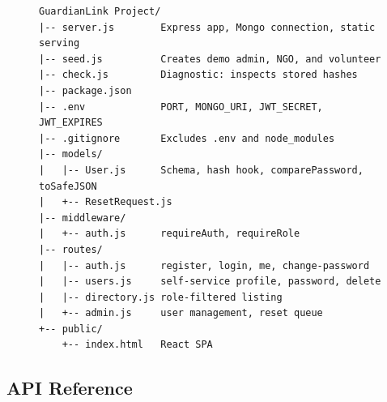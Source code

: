 \documentclass[11pt,letterpaper]{article}
\begin{document}
\begin{figure}[H]
\centering
\begin{BVerbatim}[fontsize=\small]
GuardianLink Project/
|-- server.js        Express app, Mongo connection, static serving
|-- seed.js          Creates demo admin, NGO, and volunteer
|-- check.js         Diagnostic: inspects stored hashes
|-- package.json
|-- .env             PORT, MONGO_URI, JWT_SECRET, JWT_EXPIRES
|-- .gitignore       Excludes .env and node_modules
|-- models/
|   |-- User.js      Schema, hash hook, comparePassword, toSafeJSON
|   +-- ResetRequest.js
|-- middleware/
|   +-- auth.js      requireAuth, requireRole
|-- routes/
|   |-- auth.js      register, login, me, change-password
|   |-- users.js     self-service profile, password, delete
|   |-- directory.js role-filtered listing
|   +-- admin.js     user management, reset queue
+-- public/
    +-- index.html   React SPA
\end{BVerbatim}
\end{figure}

\subsection{API Reference}
\end{document}
